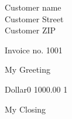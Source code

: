 \documentclass{letter}
\begin{document}
\address{Rachael Carlson \\ 3308 N. Bremen St. \\ Milwaukee, WI 53212 \\ rtc@sleeplimited.org}
\signature{Rachael Carlson}
\date{01/09/2015}

\begin{letter}{Customer name \\ Customer Street \\ Customer ZIP}
  \opening{Invoice no. 1001}
  My Greeting
  \begin{invoice}{Dollar}{0}
     {1000.00} {1}
\end{invoice}
\closing{My Closing}
\end{letter}%
\end{document}
